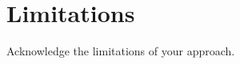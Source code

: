 \section{Limitations}

\begin{outline}
  Acknowledge the limitations of your approach.
\end{outline}
